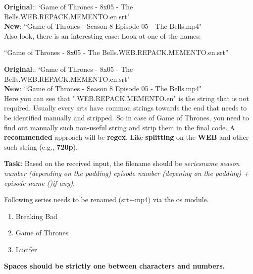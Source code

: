 \documentclass[12pt,  letterpaper,  twoside]{article}
\begin{document}
	
	
	\noindent
	\textbf{Original}:: `Game of Thrones - 8x05 - The 
	Bells.WEB.REPACK.MEMENTO.en.srt"  \\
	\textbf{New}: ``Game of Thrones - Season 8 Episode 05 - 
	The 
	Bells.mp4" \\
	
	Also look,  there is an interesting case:
	Look at one of the names:
	
	``Game of Thrones - 8x05 - The 
	Bells.WEB.REPACK.MEMENTO.en.srt''
	 
	
	
	\noindent
\textbf{Original}:: `Game of Thrones - 8x05 - The 
Bells.WEB.REPACK.MEMENTO.en.srt"  \\
\textbf{New}: ``Game of Thrones - Season 8 Episode 05 - 
The 
Bells.mp4" \\
	
	Here you can see that ".WEB.REPACK.MEMENTO.en" is the string that is not 
	required. 
	Usually every srts have common strings towards the end that needs to be 
	identified manually and stripped. So in case of Game of Thrones,  you need 
	to find 
	out manually such non-useful string and strip them in the final code. A 
	\textbf{recommended} approach will be \textbf{regex}. Like 
	\textbf{splitting} on the \textbf{WEB} and other such string (e.g., 
	\textbf{720p}).
	
	\textbf{Task:} Based on the received input,  the filename should be 
	\textit{seriesname season number (depending on the padding) episode number 
	(depening on the padding) + episode name ()if any)}.  
	
	
	Following series needs to be renamed (srt+mp4) via the os module. 
	
	\begin{enumerate}
		\item Breaking Bad
		\item Game of Thrones
				\item Lucifer
	\end{enumerate}
	
	\textbf{
		Spaces should be strictly one between characters and numbers.}
	
	
\end{document}
